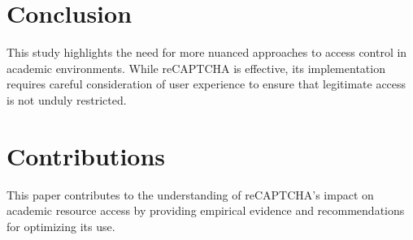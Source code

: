 \documentclass{article}
\begin{document}
\section{Conclusion}
This study highlights the need for more nuanced approaches to access control in academic environments. While reCAPTCHA is effective, its implementation requires careful consideration of user experience to ensure that legitimate access is not unduly restricted.

\section{Contributions}
This paper contributes to the understanding of reCAPTCHA's impact on academic resource access by providing empirical evidence and recommendations for optimizing its use.



\end{document}
